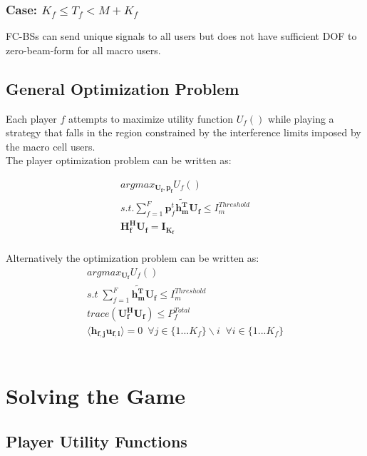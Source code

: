 \documentclass[12pt]{article}
\begin{document}
\subsubsection{Case: $K_f \leq T_f < M + K_f$}
FC-BSs can send unique signals to all users but does not have sufficient DOF to zero-beam-form for all macro users.


\subsection{General Optimization Problem}

Each player $f$ attempts to maximize utility function $U_f()$ while playing a strategy that falls in the region constrained by the interference limits imposed by the macro cell users.
\\

The player optimization problem can be written as:

\begin{gather*} 
argmax_{\mathbf{U_f,\mathbf{p}_f}} U_f() 
\\
s.t. \sum^F_{f=1} \mathbf{p}_f^t \mathbf{\tilde{h_m^T}}  \mathbf{U_f}  \leq I^{Threshold}_{m} 
\\
\mathbf{H_f^H}\mathbf{U_f} = \mathbf{I_{K_f}}
\end{gather*}
\\

Alternatively the optimization problem can be written as:
\\

\begin{gather} 
argmax_{\mathbf{U_f}} U_f()\label{utility}
\\
s.t \; \sum^F_{f=1} \mathbf{\tilde{h_m^T}}  \mathbf{U_f}  \leq I^{Threshold}_{m} \label{interference_contstraint}
\\
trace(\mathbf{U_f^H}\mathbf{U_f}) \leq P^{Total}_{f} \label{power_constraint}
\\
\langle \mathbf{h_{f,j}}\mathbf{u_{f,i}} \rangle =0\ \; \forall j \in \{1 ... K_f\}\backslash i \;\; \forall i \in \{1 ... K_f\} \label{Zero_Forcing}
\end{gather}
\\


\section{Solving the Game}
\subsection{Player Utility Functions}
\end{document}
